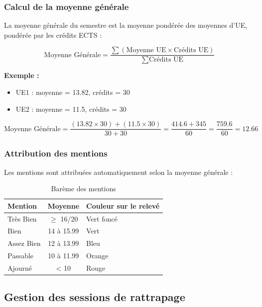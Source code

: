 \subsubsection{Calcul de la moyenne générale}

La moyenne générale du semestre est la moyenne pondérée des moyennes d'UE, pondérée par les crédits ECTS :

\begin{tcolorbox}[colback=green!5!white,colframe=green!75!black,title=Formule de calcul]
$$\text{Moyenne Générale} = \frac{\sum (\text{Moyenne UE} \times \text{Crédits UE})}{\sum \text{Crédits UE}}$$

\textbf{Exemple :}

\begin{itemize}
    \item UE1 : moyenne = 13.82, crédits = 30
    \item UE2 : moyenne = 11.5, crédits = 30
\end{itemize}

$$\text{Moyenne Générale} = \frac{(13.82 \times 30) + (11.5 \times 30)}{30 + 30} = \frac{414.6 + 345}{60} = \frac{759.6}{60} = 12.66$$
\end{tcolorbox}

\subsubsection{Attribution des mentions}

Les mentions sont attribuées automatiquement selon la moyenne générale :

\begin{table}[h]
\centering
\begin{tabular}{|l|c|l|}
\hline
\textbf{Mention} & \textbf{Moyenne} & \textbf{Couleur sur le relevé} \\
\hline
Très Bien & $\geq$ 16/20 & Vert foncé \\
\hline
Bien & 14 à 15.99 & Vert \\
\hline
Assez Bien & 12 à 13.99 & Bleu \\
\hline
Passable & 10 à 11.99 & Orange \\
\hline
Ajourné & < 10 & Rouge \\
\hline
\end{tabular}
\caption{Barème des mentions}
\end{table}

\subsection{Gestion des sessions de rattrapage}

